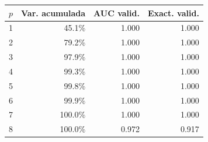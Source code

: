 \footnotesize
\begin{tabular}{crrr}
\toprule
$p$ & Var. acumulada & AUC valid. & Exact. valid. \\
\midrule
1 & 45.1\% & 1.000 & 1.000 \\
2 & 79.2\% & 1.000 & 1.000 \\
3 & 97.9\% & 1.000 & 1.000 \\
4 & 99.3\% & 1.000 & 1.000 \\
5 & 99.8\% & 1.000 & 1.000 \\
6 & 99.9\% & 1.000 & 1.000 \\
7 & 100.0\% & 1.000 & 1.000 \\
8 & 100.0\% & 0.972 & 0.917 \\
\bottomrule
\end{tabular}
